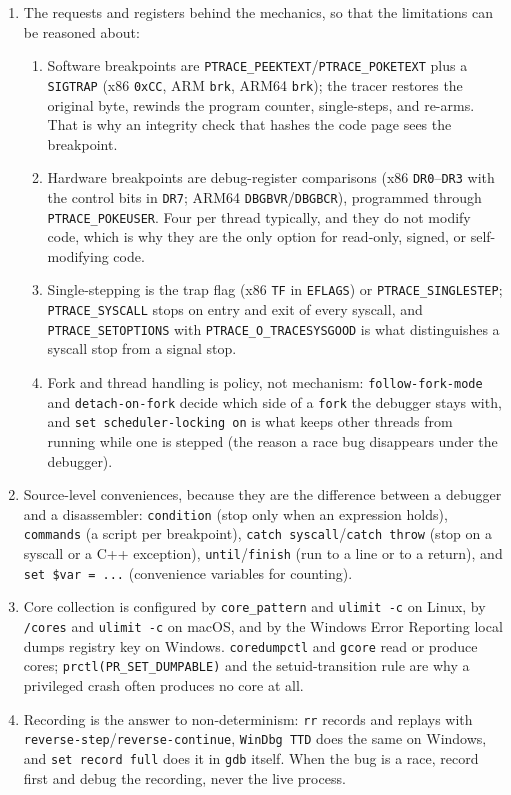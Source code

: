 \documentclass[12pt]{Training}
\begin{document}
\begin{enumerate}
    \item The requests and registers behind the mechanics, so that the limitations can be reasoned about:
    \begin{enumerate}
        \item Software breakpoints are \lstinline{PTRACE_PEEKTEXT}/\lstinline{PTRACE_POKETEXT} plus a \lstinline{SIGTRAP} (x86 \lstinline{0xCC}, ARM \lstinline{brk}, ARM64 \lstinline{brk}); the tracer restores the original byte, rewinds the program counter, single-steps, and re-arms. That is why an integrity check that hashes the code page sees the breakpoint.
        \item Hardware breakpoints are debug-register comparisons (x86 \lstinline{DR0}--\lstinline{DR3} with the control bits in \lstinline{DR7}; ARM64 \lstinline{DBGBVR}/\lstinline{DBGBCR}), programmed through \lstinline{PTRACE_POKEUSER}. Four per thread typically, and they do not modify code, which is why they are the only option for read-only, signed, or self-modifying code.
        \item Single-stepping is the trap flag (x86 \lstinline{TF} in \lstinline{EFLAGS}) or \lstinline{PTRACE_SINGLESTEP}; \lstinline{PTRACE_SYSCALL} stops on entry and exit of every syscall, and \lstinline{PTRACE_SETOPTIONS} with \lstinline{PTRACE_O_TRACESYSGOOD} is what distinguishes a syscall stop from a signal stop.
        \item Fork and thread handling is policy, not mechanism: \lstinline{follow-fork-mode} and \lstinline{detach-on-fork} decide which side of a \lstinline{fork} the debugger stays with, and \lstinline{set scheduler-locking on} is what keeps other threads from running while one is stepped (the reason a race bug disappears under the debugger).
    \end{enumerate}
    \item Source-level conveniences, because they are the difference between a debugger and a disassembler: \lstinline{condition} (stop only when an expression holds), \lstinline{commands} (a script per breakpoint), \lstinline{catch syscall}/\lstinline{catch throw} (stop on a syscall or a C++ exception), \lstinline{until}/\lstinline{finish} (run to a line or to a return), and \lstinline{set $var = ...} (convenience variables for counting).
    \item Core collection is configured by \lstinline{core_pattern} and \lstinline{ulimit -c} on Linux, by \lstinline{/cores} and \lstinline{ulimit -c} on macOS, and by the Windows Error Reporting local dumps registry key on Windows. \lstinline{coredumpctl} and \lstinline{gcore} read or produce cores; \lstinline{prctl(PR_SET_DUMPABLE)} and the setuid-transition rule are why a privileged crash often produces no core at all.
    \item Recording is the answer to non-determinism: \lstinline{rr} records and replays with \lstinline{reverse-step}/\lstinline{reverse-continue}, \lstinline{WinDbg TTD} does the same on Windows, and \lstinline{set record full} does it in \lstinline{gdb} itself. When the bug is a race, record first and debug the recording, never the live process.
\end{enumerate}
\end{document}
